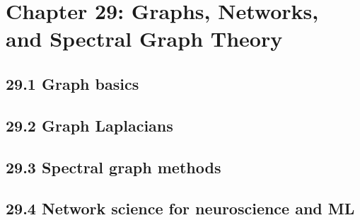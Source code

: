 \section{Chapter 29: Graphs, Networks, and Spectral Graph Theory}

\subsection{29.1 Graph basics}

\subsection{29.2 Graph Laplacians}

\subsection{29.3 Spectral graph methods}

\subsection{29.4 Network science for neuroscience and ML}

\clearpage
